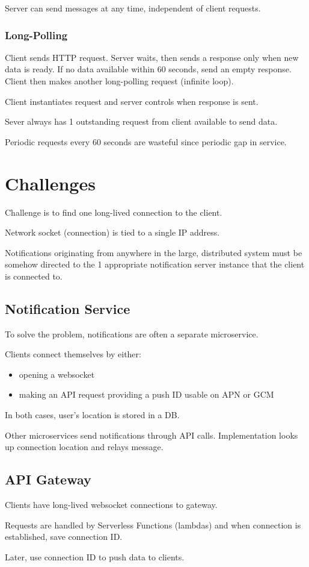 \documentclass[11pt]{article}
\begin{document}
Server can send messages at any time, independent of client requests.
\subsubsection{Long-Polling}
\label{sec:org6203f81}
Client sends HTTP request.
Server waits, then sends a response only when new data is ready.
If no data available within 60 seconds, send an empty response.
Client then makes another long-polling request (infinite loop).

Client instantiates request and server controls when response is sent.

Sever always has 1 outstanding request from client available to send data.

Periodic requests every 60 seconds are wasteful since periodic gap in service.
\section{Challenges}
\label{sec:org57d6805}
Challenge is to find one long-lived connection to the client.

Network socket (connection) is tied to a single IP address.

Notifications originating from anywhere in the large, distributed system must be somehow directed to the 1
appropriate notification server instance that the client is connected to.
\subsection{Notification Service}
\label{sec:org28480f0}
To solve the problem, notifications are often a separate microservice.

Clients connect themselves by either:
\begin{itemize}
\item opening a websocket
\item making an API request providing a push ID usable on APN or GCM
\end{itemize}

In both cases, user's location is stored in a DB.

Other microservices send notifications through API calls.
Implementation looks up connection location and relays message.
\subsection{API Gateway}
\label{sec:orgd3d0ff2}
Clients have long-lived websocket connections to gateway.

Requests are handled by Serverless Functions (lambdas) and when connection is established, save
connection ID.

Later, use connection ID to push data to clients.
\end{document}
